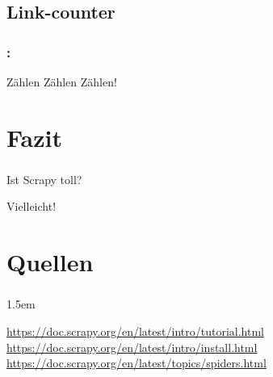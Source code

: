 \documentclass{beamer}
\begin{document}
\subsection{Link-counter}
\begin{frame}
	\frametitle{\insertsection{}: \insertsubsection{}}
	\rightarrow Zählen Zählen Zählen!
\end{frame}


\section{Fazit}
\begin{frame}
	\frametitle{\insertsection{}}
Ist Scrapy toll?

Vielleicht!
\end{frame}

\section{Quellen}
\begin{frame}
	\frametitle{\insertsection{}}
	\emergencystretch 1.5em
	{\small
	\begin{thebibliography}{8}
		\url{https://doc.scrapy.org/en/latest/intro/tutorial.html}
		\url{https://doc.scrapy.org/en/latest/intro/install.html}
		\url{https://doc.scrapy.org/en/latest/topics/spiders.html}
	\end{thebibliography}
	}
\end{frame}
\end{document}
